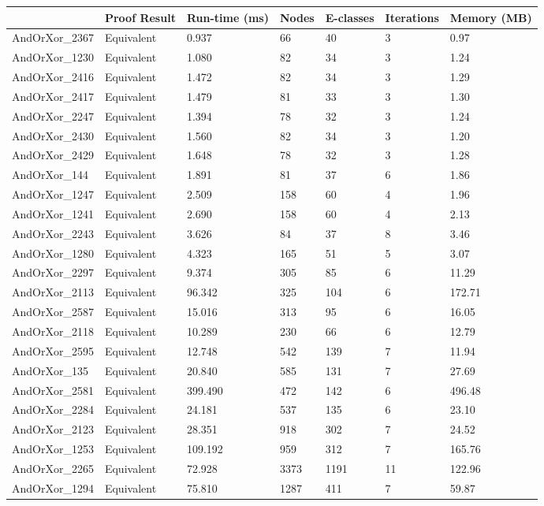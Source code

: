 \begin{tabular}{lllllll}
\toprule
 & Proof Result & Run-time (ms) & Nodes & E-classes & Iterations & Memory (MB) \\
\midrule
AndOrXor\_2367 & Equivalent & 0.937 & 66 & 40 & 3 & 0.97 \\
AndOrXor\_1230 & Equivalent & 1.080 & 82 & 34 & 3 & 1.24 \\
AndOrXor\_2416 & Equivalent & 1.472 & 82 & 34 & 3 & 1.29 \\
AndOrXor\_2417 & Equivalent & 1.479 & 81 & 33 & 3 & 1.30 \\
AndOrXor\_2247 & Equivalent & 1.394 & 78 & 32 & 3 & 1.24 \\
AndOrXor\_2430 & Equivalent & 1.560 & 82 & 34 & 3 & 1.20 \\
AndOrXor\_2429 & Equivalent & 1.648 & 78 & 32 & 3 & 1.28 \\
AndOrXor\_144 & Equivalent & 1.891 & 81 & 37 & 6 & 1.86 \\
AndOrXor\_1247 & Equivalent & 2.509 & 158 & 60 & 4 & 1.96 \\
AndOrXor\_1241 & Equivalent & 2.690 & 158 & 60 & 4 & 2.13 \\
AndOrXor\_2243 & Equivalent & 3.626 & 84 & 37 & 8 & 3.46 \\
AndOrXor\_1280 & Equivalent & 4.323 & 165 & 51 & 5 & 3.07 \\
AndOrXor\_2297 & Equivalent & 9.374 & 305 & 85 & 6 & 11.29 \\
AndOrXor\_2113 & Equivalent & 96.342 & 325 & 104 & 6 & 172.71 \\
AndOrXor\_2587 & Equivalent & 15.016 & 313 & 95 & 6 & 16.05 \\
AndOrXor\_2118 & Equivalent & 10.289 & 230 & 66 & 6 & 12.79 \\
AndOrXor\_2595 & Equivalent & 12.748 & 542 & 139 & 7 & 11.94 \\
AndOrXor\_135 & Equivalent & 20.840 & 585 & 131 & 7 & 27.69 \\
AndOrXor\_2581 & Equivalent & 399.490 & 472 & 142 & 6 & 496.48 \\
AndOrXor\_2284 & Equivalent & 24.181 & 537 & 135 & 6 & 23.10 \\
AndOrXor\_2123 & Equivalent & 28.351 & 918 & 302 & 7 & 24.52 \\
AndOrXor\_1253 & Equivalent & 109.192 & 959 & 312 & 7 & 165.76 \\
AndOrXor\_2265 & Equivalent & 72.928 & 3373 & 1191 & 11 & 122.96 \\
AndOrXor\_1294 & Equivalent & 75.810 & 1287 & 411 & 7 & 59.87 \\

\end{tabular}
